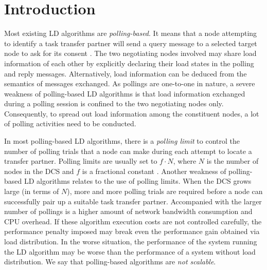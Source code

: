 %

\chapter{Introduction}


Most existing LD algorithms are {\it polling-based\/}.
It means that a node attempting to identify a task transfer partner
will send a query message to a selected target node to ask for its consent
\cite{casavant88,eager86a,eager86b,lu94,lu95b,shiv90,wang85}.
The two negotiating nodes involved may share load information of each other
by explicitly declaring
their load states in the polling and reply messages.
Alternatively, load information can be deduced from the
semantics of messages exchanged.
%
As pollings are one-to-one in nature,
a severe weakness of polling-based LD algorithms is that
load information exchanged during a polling session
is confined to the two negotiating nodes only.
Consequently, to spread out load information among the constituent nodes,
a lot of polling activities need to be conducted.

In most polling-based LD algorithms, there is a
{\it polling limit\/} to control the number of polling trials that a node
can make during each attempt to locate a transfer partner.
Polling limits are usually set to $f \cdot N$, where $N$ is the number
of nodes in the DCS and $f$ is a fractional constant
\cite{eager86a,lu95b}.
%
Another weakness of polling-based LD algorithms relates to
the use of polling limits.
When the DCS grows large (in terms of $N$),
more and more polling trials are required before a node can successfully
pair up a suitable task transfer partner.
%
Accompanied with the larger number of pollings is
a higher amount of network bandwidth consumption and CPU overhead.
If these algorithm execution costs are not controlled carefully,
the performance penalty imposed may break even the
performance gain obtained via load distribution.
In the worse situation, the performance of the system
running the LD algorithm may be worse than the performance of 
a system without load distribution.
We say that polling-based algorithms are {\it not scalable\/}.


\chapterend
